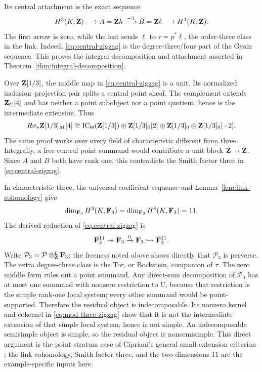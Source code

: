 Its central attachment is the exact sequence
\begin{equation}\label{eq:central-zigzag}
 H^3(K,\mathbf Z)\longrightarrow
 A=\mathbf Z h\xrightarrow{-3}B=\mathbf Z\ell
 \longrightarrow H^4(K,\mathbf Z).
\end{equation}
The first arrow is zero, while the last sends \(\ell\) to
\(\tau=p^*\ell\), the order-three class in the link.  Indeed,
\eqref{eq:central-zigzag} is the degree-three/four part of the Gysin
sequence.  This proves the integral decomposition and attachment asserted
in Theorem~\ref{thm:integral-decomposition}.

Over \(\mathbf Z[1/3]\), the middle map in
\eqref{eq:central-zigzag} is a unit.  Its normalized inclusion--projection
pair splits a central point sheaf.  The complement extends \(\mathbf Z_U[4]\) and
has neither a point subobject nor a point quotient, hence is the intermediate
extension.  Thus
\begin{equation}\label{eq:localized-decomposition}
 R\sigma_*\mathbf Z[1/3]_M[4]\cong
 \operatorname{IC}_\Theta(\mathbf Z[1/3])\oplus
 \mathbf Z[1/3]_0[2]\oplus\mathbf Z[1/3]_0\oplus\mathbf Z[1/3]_0[-2].
\end{equation}
The same proof works over every field of characteristic different from
three.  Integrally, a free central point summand would contribute a unit block
\(\mathbf Z\to\mathbf Z\).  Since \(A\) and \(B\) both have rank one, this contradicts
the Smith factor three in \eqref{eq:central-zigzag}.

In characteristic three, the universal-coefficient sequence and
Lemma~\ref{lem:link-cohomology} give
\[
 \dim_{\mathbf F_3}H^3(K,\mathbf F_3)=
 \dim_{\mathbf F_3}H^4(K,\mathbf F_3)=11.
\]
The derived reduction of \eqref{eq:central-zigzag} is
\begin{equation}\label{eq:mod-three-zigzag}
 \mathbf F_3^{11}\twoheadrightarrow\mathbf F_3
 \xrightarrow{0}\mathbf F_3\hookrightarrow\mathbf F_3^{11}.
\end{equation}
Write \(\mathcal P_3=\mathcal P\otimes^{L}_{\mathbf Z}\mathbf F_3\); the freeness noted
above shows directly that \(\mathcal P_3\) is perverse.
The extra degree-three class is the Tor, or Bockstein, companion of
\(\tau\).  The zero middle form rules out a point summand.  Any direct-sum
decomposition of \(\mathcal P_3\) has at most one summand with
nonzero restriction to \(U\), because that restriction is the simple
rank-one local system; every other summand would be point-supported.
Therefore the residual object is indecomposable.  Its nonzero kernel and
cokernel in \eqref{eq:mod-three-zigzag} show that it is not the intermediate
extension of that simple local system, hence is not simple.  An
indecomposable semisimple object is simple, so the residual object is
nonsemisimple.
This direct argument is the point-stratum case of Cipriani's general
small-extension criterion
\cite[Lemma~3.12, Theorem~3.21, and Corollary~3.22]{Cipriani}; the link
cohomology, Smith factor three, and the two dimensions \(11\) are the
example-specific inputs here.

